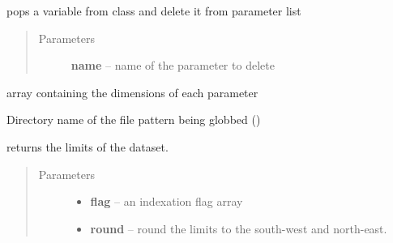 \documentclass[letterpaper,10pt,english]{sphinxmanual}
\begin{document}
\begin{fulllineitems}
\begin{fulllineitems}
\label{altimetry.data:altimetry.data.hydro_data.delete_Variable}
pops a variable from class and delete it from parameter list
\begin{quote}\begin{description}
\item[{Parameters}] \leavevmode
\textbf{name} -- name of the parameter to delete

\end{description}\end{quote}

\end{fulllineitems}


\begin{fulllineitems}
\label{altimetry.data:altimetry.data.hydro_data.dim_list}
array containing the dimensions of each parameter

\end{fulllineitems}


\begin{fulllineitems}
\label{altimetry.data:altimetry.data.hydro_data.dirname}
Directory name of the file pattern being globbed (\href{http://docs.python.org/library/glob.html\#glob.glob}{})

\end{fulllineitems}


\begin{fulllineitems}
\label{altimetry.data:altimetry.data.hydro_data.extension}
returns the limits of the dataset.
\begin{quote}\begin{description}
\item[{Parameters}] \leavevmode\begin{itemize}
\item {} 
\textbf{flag} -- an indexation flag array

\item {} 
\textbf{round} -- round the limits to the south-west and north-east.


\end{itemize}
\end{description}
\end{quote}
\end{fulllineitems}
\end{fulllineitems}
\end{document}
